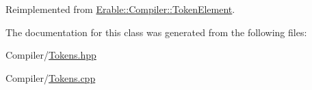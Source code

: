 Reimplemented from \mbox{\hyperlink{class_erable_1_1_compiler_1_1_token_element_a1ff3e31b4064cd22463c91130a819646}{Erable\+::\+Compiler\+::\+Token\+Element}}.



The documentation for this class was generated from the following files\+:\begin{DoxyCompactItemize}
\item 
Compiler/\mbox{\hyperlink{_tokens_8hpp}{Tokens.\+hpp}}\item 
Compiler/\mbox{\hyperlink{_tokens_8cpp}{Tokens.\+cpp}}\end{DoxyCompactItemize}
